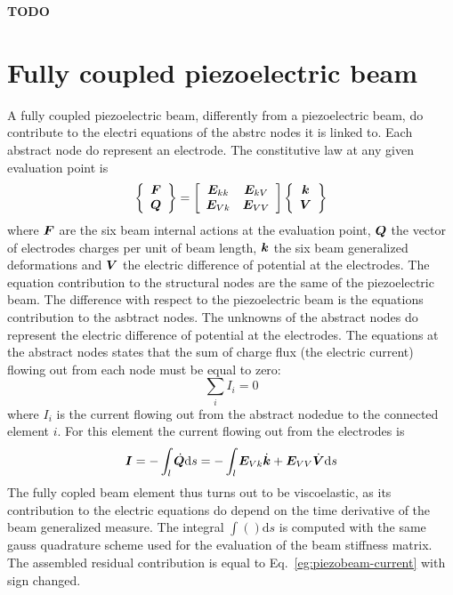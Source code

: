 \textbf{TODO}
\section{Fully coupled piezoelectric beam}
A fully coupled piezoelectric beam, differently from a piezoelectric beam,
do contribute to the electri equations of the abstrc nodes it is
linked to.
Each abstract node do represent an electrode. The constitutive law
at any given evaluation point is
\begin{equation}
	\cubr{
		\cvvect{
			\T{F}\\
			\T{Q}
		}
	}=\sqbr{
		\matr{cc}{
			\T{E}_{kk} & \T{E}_{kV}\\
			\T{E}_{Vk} & \T{E}_{VV}
		}
	}
	\cubr{
		\cvvect{
			\T{k}\\
			\T{V}
		}
	}
\end{equation}
where $\T{F}$ are the six beam internal actions at the evaluation point, 
$\T{Q}$ the vector of electrodes charges per unit of beam length,
$\T{k}$ the six beam generalized deformations and $\T{V}$ the electric difference of potential
at the electrodes.
The equation contribution to the structural nodes are the same of the piezoelectric beam.
The difference with respect to the piezoelectric beam is the equations contribution to the
asbtract nodes. The unknowns of the abstract nodes do represent the electric difference of potential
at the electrodes. The equations at the abstract nodes states that the sum of charge flux (the electric
current) flowing out from each node must be equal to zero:
\begin{equation}
	\sum_i I_i = 0
\end{equation}
where $I_i$ is the current flowing out from the abstract nodedue to the connected element $i$.
For this element the current flowing out from the electrodes is
\begin{equation}
	\T{I} = -\int_l \dot{\T{Q}} \mathrm{d}s = 
		-\int_l \T{E}_{Vk}\dot{\T{k}}  + \T{E}_{VV} \dot{\T{V}} \mathrm{d}s
		\label{eg:piezobeam-current}
\end{equation}
The fully copled beam element thus turns out to be viscoelastic, as its contribution to the electric
equations do depend on the time derivative of the beam generalized measure.
The integral $\int () \mathrm{d}s$ is computed with the same gauss quadrature scheme
used for the evaluation of the beam stiffness matrix.
The assembled residual contribution is equal to Eq.~\eqref{eg:piezobeam-current} with sign changed.
